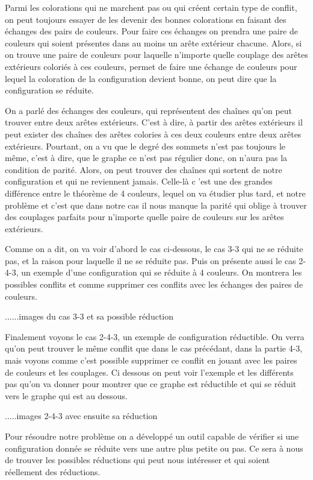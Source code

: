 \documentclass[10pt,a4paper]{article}
\begin{document}
Parmi les colorations qui ne marchent pas ou qui créent certain type de conflit, on peut toujours essayer de les devenir des bonnes colorations en faisant des échanges des pairs de couleurs. Pour faire ces échanges on prendra une paire de couleurs qui soient présentes dans au moins un arête extérieur chacune. Alors, si on trouve une paire de couleurs pour laquelle n'importe quelle couplage des arêtes extérieurs coloriés à ces couleurs, permet de faire une échange de couleurs pour lequel la coloration de la configuration devient bonne, on peut dire que la configuration se réduite.

On a parlé des échanges des couleurs, qui représentent des chaînes qu'on peut trouver entre deux arêtes extérieurs. C'est à dire, à partir des arêtes extérieurs il peut exister des chaînes des arêtes colories à ces deux couleurs entre deux arêtes extérieurs. Pourtant, on a vu que le degré des sommets n'est pas toujours le même, c'est à dire, que le graphe ce n'est pas régulier donc, on n'aura pas la condition de parité. Alors, on peut trouver des chaînes qui sortent de notre configuration et qui ne reviennent jamais. Celle-là c 'est une des grandes différence entre le théorème de 4 couleurs, lequel on va étudier plus tard, et notre problème et c'est que dans notre cas il nous manque la parité qui oblige à trouver des couplages parfaits pour n'importe quelle paire de couleurs sur les arêtes extérieurs.

Comme on a dit, on va voir d'abord le cas ci-dessous, le cas 3-3 qui ne se réduite pas, et la raison pour laquelle il ne se réduite pas. Puis on présente aussi le cas 2-4-3, un exemple d'une configuration qui se réduite à 4 couleurs. On montrera les possibles conflits et comme supprimer ces conflits avec les échanges des paires de couleurs. 


......images du cas 3-3 et sa possible réduction

Finalement voyons le cas 2-4-3, un exemple de configuration réductible. On verra qu'on peut trouver le même conflit que dans le cas précédant, dans la partie 4-3, mais voyons comme c'est possible supprimer ce conflit en jouant avec les paires de couleurs et les couplages. Ci dessous on peut voir l'exemple et les différents pas qu'on va donner pour montrer que ce graphe est réductible et qui se réduit vers le graphe qui est au dessous.

.....images 2-4-3 avec ensuite sa réduction

Pour résoudre notre problème on a développé un outil capable de vérifier si une configuration donnée se réduite vers une autre plus petite ou pas. Ce sera à nous de trouver les possibles réductions qui peut nous intéresser et qui soient réellement des réductions.
\end{document}
